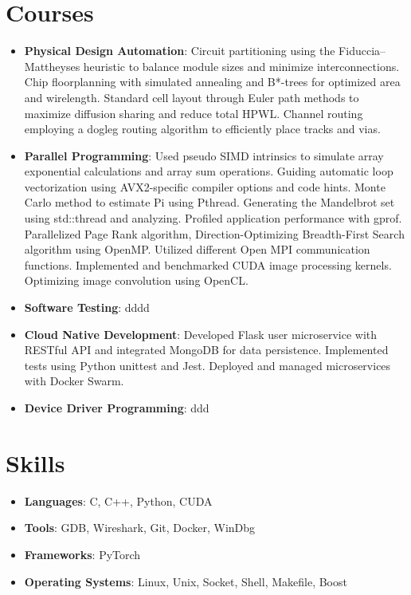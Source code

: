 \documentclass[letterpaper,11pt]{article}
\newcommand{\resumeItem}[2]{
  \item\small{
    \textbf{#1}{: #2 \vspace{-2pt}}
  }
}
\newcommand{\resumeSubItem}[2]{\resumeItem{#1}{#2}\vspace{-4pt}}
\newcommand{\resumeSubHeadingListStart}{\begin{itemize}[leftmargin=*]}
\newcommand{\resumeSubHeadingListEnd}{\end{itemize}}
\begin{document}
\section{Courses}
  \resumeSubHeadingListStart
    \resumeSubItem{Physical Design Automation}
      {Circuit partitioning using the Fiduccia–Mattheyses heuristic to balance module sizes and minimize interconnections. 
        Chip floorplanning with simulated annealing and B*-trees for optimized area and wirelength.
        Standard cell layout through Euler path methods to maximize diffusion sharing and reduce total HPWL.
        Channel routing employing a dogleg routing algorithm to efficiently place tracks and vias.}
    \resumeSubItem{Parallel Programming}
      {Used pseudo SIMD intrinsics to simulate array exponential calculations and array sum operations.
      Guiding automatic loop vectorization using AVX2-specific compiler options and code hints. 
      Monte Carlo method to estimate Pi using Pthread. 
      Generating the Mandelbrot set using std::thread and analyzing.
      Profiled application performance with gprof.
      Parallelized Page Rank algorithm, Direction-Optimizing Breadth-First Search algorithm using OpenMP.
      Utilized different Open MPI communication functions.
      Implemented and benchmarked CUDA image processing kernels.
      Optimizing image convolution using OpenCL.
      }
    \resumeSubItem{Software Testing}
      {dddd}
    \resumeSubItem{Cloud Native Development}
      {Developed Flask user microservice with RESTful API and integrated MongoDB for data persistence.
      Implemented tests using Python unittest and Jest. Deployed and managed microservices with Docker Swarm.
      }
    \resumeSubItem{Device Driver Programming}
      {ddd}
  \resumeSubHeadingListEnd

\section{Skills}
  \resumeSubHeadingListStart
  \resumeSubItem{Languages}
    {C, C++, Python, CUDA}
  \resumeSubItem{Tools}
    {GDB, Wireshark, Git, Docker, WinDbg}
  \resumeSubItem{Frameworks}
    {PyTorch}
  \resumeSubItem{Operating Systems}
    {Linux, Unix, Socket, Shell, Makefile, Boost}
  \resumeSubHeadingListEnd

\end{document}
